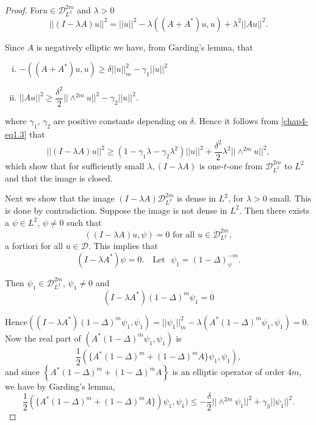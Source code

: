 \begin{proof}
For\pageoriginale $u \in\mathscr{D}^{2m}_{L^2} $ and $\lambda>0$ 
\begin{equation*}
|| (I - \lambda A) u ||^2 = || u ||^2 - \lambda ((A+A^*) u, u) +
\lambda^2 || A u ||^2. \tag{1.3}\label{chap4-eq1.3} 
\end{equation*}

Since $A$ is negatively elliptic we have, from
G$\ring{\text{a}}$rding's lemma, that  
\begin{enumerate}[(i)]
\item $- (( A + A^* ) u, u ) \geq \delta || u ||^2_m - \gamma_1 || u
  || ^2 $ 

\item $||Au ||^2 \geq \dfrac{\delta^2 }{2} || \wedge^{2m} u ||^2 -
  \gamma_2 || u ||^2$.  
\end{enumerate}
\noindent
where $\gamma_1$, $\gamma_2$ are positive constants depending on
$\delta$. Hence it follows from \eqref{chap4-eq1.3} that  
\begin{equation}
|| (I - \lambda A) u ||^2 \geq (1 - \gamma_1 \lambda -\gamma_2
\lambda^2) ||u||^2 + \frac{\delta^2}{2} \lambda^2 || \wedge^{2m}
u||^2 , \tag{1.4} \label{chap4-eq1.4}
\end{equation}
which show that for sufficiently small $\lambda, (I - \lambda A)$ is
one-$t$-one from $\mathscr{D}^{2m}_{L^2}$ to $L^2$ and that the image
is closed.  

Next we show that the image $(I - \lambda A) \mathscr{D}^{2m}_{L^2}$
is dense in $L^2$, for $\lambda>0$ small. This is done by 
contradiction. Suppose the image is not dense in $L^2$. Then there
exists a $\psi \in L^2$, $\psi \neq 0$ such that  
$$
(( I - \lambda A) u,  \psi) = 0 \text{ for all } u \in 
\mathscr{D}^{2m}_{L^2}, 
$$
a fortiori for all $u \in \mathscr{D}$. This implies that   
\begin{equation}
(I - \lambda A^*) \psi =  0. \text{~~ Let~ } \psi_1 = (1 - 
  \Delta)^{-m}_\psi.\tag{1.6}\label{chap4-eq1.6} 
\end{equation}

Then $\psi_1 \in \mathscr{D}^{2m}_{L^2}$, $\psi_1 \neq 0$ and  
$$
(I - \lambda A^*) (1- \Delta)^m \psi _1 = 0  
$$

Hence\pageoriginale $((I - \lambda A^*) (1 - \Delta )^m \psi _1,
\psi_1) = || \psi_1 ||^2_m - \lambda (A^* (1 - \Delta)^m \psi_1,
\psi_1 ) = 0$. Now the 
real part of $(A^*(1-\Delta )^m \psi_1, \psi_1)$ is  
$$
\frac{1}{2}(\{A^*(1 - \Delta)^m + (1 - \Delta)^m A \} \psi_1,
\psi_1),  
$$
and since $\left\{A^* (1 - \Delta )^m + (1 - \Delta)^m A \right\}$ is
an elliptic operator of order $4m$, we have by
G$\ring{\text{a}}$rding's lemma,    
\begin{equation}
\frac{1}{2}( \{A^* (1 - \Delta )^m  + (1 - \Delta)^m A\}) \psi_1,
\psi_1) \leq - \frac{\delta}{2} || \wedge^{2m} \psi_1 ||^2 + \gamma_3
|| \psi_1 ||^2. \tag{1.7}  \label{chap4-eq1.7}
\end{equation}


\end{proof}
